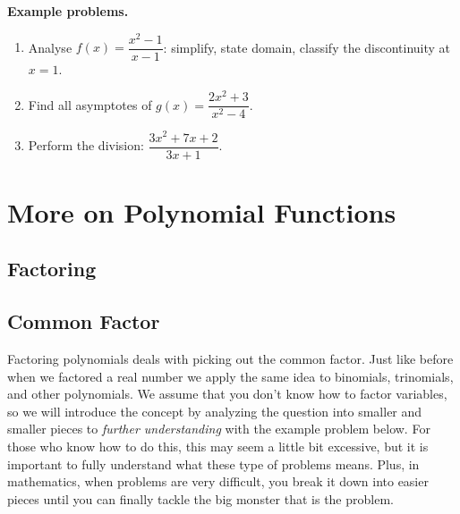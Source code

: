 \textbf{Example problems.}
\begin{enumerate}
    \item Analyse $f(x)=\dfrac{x^2-1}{x-1}$: simplify, state domain,
          classify the discontinuity at $x=1$.
    \item Find all asymptotes of $g(x)=\dfrac{2x^2+3}{x^2-4}$.
    \item Perform the division:
          $\dfrac{3x^2+7x+2}{3x+1}$.
\end{enumerate}



\section{More on Polynomial Functions}
\label{sec:more-79ef}



\subsection{Factoring}
\label{sss:fact-bd72}





\subsection{Common Factor}
\label{sss:comm-7bac}




Factoring polynomials deals with picking out the common factor. Just like before when we
factored a real number we apply the same idea to binomials, trinomials, and other
polynomials. We assume that you don't know how to factor variables, so we will introduce
the concept by analyzing the question into smaller and smaller pieces to \textit{further
understanding} with the example problem below. For those who know how to do this, this may
seem a little bit excessive, but it is important to fully understand what these type of
problems means. Plus, in mathematics, when problems are very difficult, you break it down
into easier pieces until you can finally tackle the big monster that is the problem.




